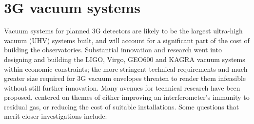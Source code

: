 \section{3G vacuum systems}
Vacuum systems for planned 3G detectors are likely to be the largest ultra-high vacuum (UHV) systems built, and will account for a significant part of the cost of building the observatories. Substantial innovation and research went into designing and building the LIGO, Virgo, GEO600 and KAGRA vacuum systems within economic constraints; the more stringent technical requirements and much greater size required for 3G vacuum envelopes threaten to render them infeasible without still further innovation. Many avenues for technical research have been proposed,  centered on themes of either improving an interferometer’s immunity to residual gas, or reducing the cost of suitable installations. Some questions that merit closer investigations include:

